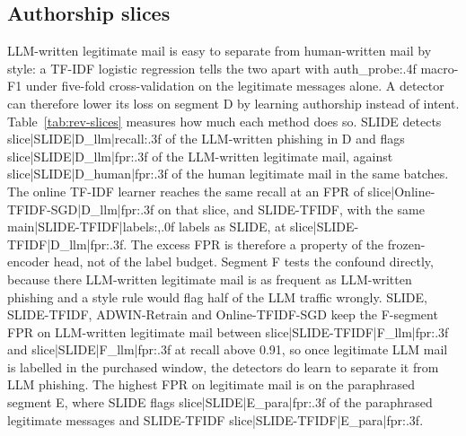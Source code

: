 {{{{{{\subsection{Authorship slices}\label{sec:slices}
LLM-written legitimate mail is easy to separate from human-written mail by style: a TF-IDF logistic regression tells the two apart with {{auth_probe:.4f}} macro-F1 under five-fold cross-validation on the legitimate messages alone. A detector can therefore lower its loss on segment D by learning authorship instead of intent. Table~\ref{tab:rev-slices} measures how much each method does so. SLIDE detects {{slice|SLIDE|D_llm|recall:.3f}} of the LLM-written phishing in D and flags {{slice|SLIDE|D_llm|fpr:.3f}} of the LLM-written legitimate mail, against {{slice|SLIDE|D_human|fpr:.3f}} of the human legitimate mail in the same batches. The online TF-IDF learner reaches the same recall at an FPR of {{slice|Online-TFIDF-SGD|D_llm|fpr:.3f}} on that slice, and SLIDE-TFIDF, with the same {{main|SLIDE-TFIDF|labels:,.0f}} labels as SLIDE, at {{slice|SLIDE-TFIDF|D_llm|fpr:.3f}}. The excess FPR is therefore a property of the frozen-encoder head, not of the label budget. Segment F tests the confound directly, because there LLM-written legitimate mail is as frequent as LLM-written phishing and a style rule would flag half of the LLM traffic wrongly. SLIDE, SLIDE-TFIDF, ADWIN-Retrain and Online-TFIDF-SGD keep the F-segment FPR on LLM-written legitimate mail between {{slice|SLIDE-TFIDF|F_llm|fpr:.3f}} and {{slice|SLIDE|F_llm|fpr:.3f}} at recall above 0.91, so once legitimate LLM mail is labelled in the purchased window, the detectors do learn to separate it from LLM phishing. The highest FPR on legitimate mail is on the paraphrased segment E, where SLIDE flags {{slice|SLIDE|E_para|fpr:.3f}} of the paraphrased legitimate messages and SLIDE-TFIDF {{slice|SLIDE-TFIDF|E_para|fpr:.3f}}.



}}}}}}
